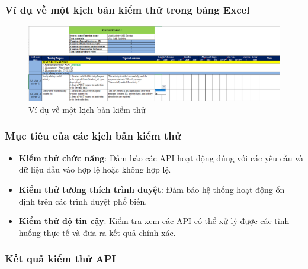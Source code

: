 \subsubsection{Ví dụ về một kịch bản kiểm thử trong bảng Excel}
\begin{figure}[H]
    \centering
    \includegraphics[scale=0.5]{Images/Implement/testScenario.png}
    \caption{Ví dụ về một kịch bản kiểm thử}
\end{figure}
\subsubsection{Mục tiêu của các kịch bản kiểm thử}
\begin{itemize}
    \item \textbf{Kiểm thử chức năng}: Đảm bảo các API hoạt động đúng với các yêu cầu và dữ liệu đầu vào hợp lệ hoặc không hợp lệ. 
    \item \textbf{Kiểm thử tương thích trình duyệt}: Đảm bảo hệ thống hoạt động ổn định trên các trình duyệt phổ biến.
    \item \textbf{Kiểm thử độ tin cậy}: Kiểm tra xem các API có thể xử lý được các tình huống thực tế và đưa ra kết quả chính xác.
\end{itemize}
\subsubsection{Kết quả kiểm thử API}
